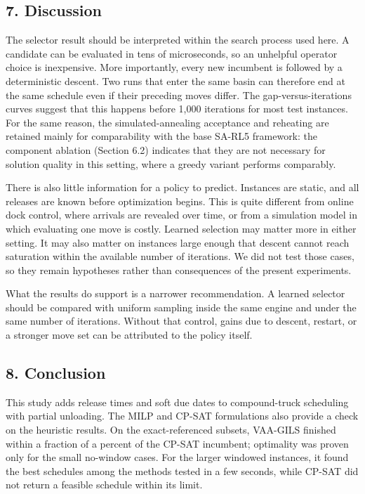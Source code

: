 \documentclass[
]{article}
\begin{document}
\subsection{7. Discussion}\label{discussion}

The selector result should be interpreted within the search process used
here. A candidate can be evaluated in tens of microseconds, so an
unhelpful operator choice is inexpensive. More importantly, every new
incumbent is followed by a deterministic descent. Two runs that enter
the same basin can therefore end at the same schedule even if their
preceding moves differ. The gap-versus-iterations curves suggest that this happens
before 1,000 iterations for most test instances. For the same reason,
the simulated-annealing acceptance and reheating are retained mainly for
comparability with the base SA-RL5 framework: the component ablation
(Section 6.2) indicates that they are not necessary for solution quality
in this setting, where a greedy variant performs comparably.

There is also little information for a policy to predict. Instances are
static, and all releases are known before optimization begins. This is
quite different from online dock control, where arrivals are revealed
over time, or from a simulation model in which evaluating one move is
costly. Learned selection may matter more in either setting. It may also
matter on instances large enough that descent cannot reach saturation
within the available number of iterations. We did not test those cases, so they remain
hypotheses rather than consequences of the present experiments.

What the results do support is a narrower recommendation. A learned
selector should be compared with uniform sampling inside the same engine
and under the same number of iterations. Without that control, gains due to
descent, restart, or a stronger move set can be attributed to the policy
itself.

\subsection{8. Conclusion}\label{conclusion}

This study adds release times and soft due dates to compound-truck
scheduling with partial unloading. The MILP and CP-SAT formulations also
provide a check on the heuristic results. On the exact-referenced
subsets, VAA-GILS finished within a fraction of a percent of the CP-SAT
incumbent; optimality was proven only for the small no-window cases. For
the larger windowed instances, it found the best schedules among the
methods tested in a few seconds, while CP-SAT did not return a feasible
schedule within its limit.
\end{document}
